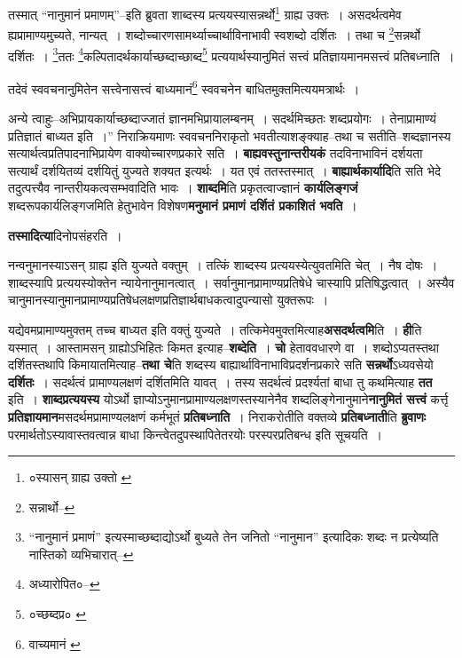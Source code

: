 \documentclass[article,12pt,a4paper]{memoir}
\begin{document}
	तस्मात् “नानुमानं प्रमाणम्”--इति ब्रुवता शाब्दस्य प्रत्ययस्यासन्नर्थो\footnote{०स्यासन् ग्राह्य उक्तो \cite{dp-msA} \cite{dp-edP} \cite{dp-edH} \cite{dp-edN}} ग्राह्य उक्तः । असदर्थत्वमेव ह्यप्रामाण्यमुच्यते, नान्यत् । शब्दोच्चारणसामर्थ्याच्चार्थाविनाभावी स्वशब्दो दर्शितः । तथा च \footnote{सन्नार्थो--\cite{dp-edE}}\-सन्नर्थो दर्शितः । \footnote{“नानुमानं प्रमाणं” इत्यस्माच्छब्दाद्योऽर्थो बुध्यते तेन जनितो “नानुमान” इत्यादिकः शब्दः न प्रत्येष्यति नास्तिको व्यभिचारात्--\cite{dp-msD-n}}\-ततः \footnote{अध्यारोपित०--\cite{dp-msD-n}}\-कल्पितादर्थकार्याच्छब्दाच्छाब्द\footnote{०च्छब्दप्र० \cite{dp-msA}} प्रत्ययार्थस्यानुमितं सत्त्वं प्रतिज्ञायमानमसत्त्वं प्रतिबध्नाति । 
	  
	तदेवं स्ववचनानुमितेन सत्त्वेनासत्त्वं बाध्यमानं\footnote{वाच्यमानं \cite{dp-msA} \cite{dp-msB} \cite{dp-edP} \cite{dp-edH} \cite{dp-edE} \cite{dp-edN}} स्ववचनेन बाधितमुक्तमित्ययमत्रार्थः । 
	  
	अन्ये त्वाहुः--अभिप्रायकार्याच्छब्दाज्जातं ज्ञानमभिप्रायालम्बनम् । सदर्थमिच्छतः शब्दप्रयोगः । तेनाप्रामाण्यं प्रतिज्ञातं बाध्यत इति ।” निराक्रियमाणः स्ववचननिराकृतो भवतीत्याशङ्क्याह--तथा च सतीति--शब्दज्ञानस्य सत्यार्थत्वप्रतिपादनाभिप्रायेण वाक्योच्चारणप्रकारे सति । \textbf{बाह्यवस्तुनान्तरीयकं} तदविनाभाविनं दर्शयता सत्यार्थं दर्शयितव्यं दर्शयितुं युज्यते शक्यत इत्यर्थः । यत एवं ततस्तस्मात् । \textbf{बाह्यार्थकार्यादि}ति सति भेदे तदुत्पत्त्यैव नान्तरीयकत्वसम्भवादिति भावः । \textbf{शाब्दमि}ति प्रकृतत्वाज्ज्ञानं \textbf{कार्यलिङ्गजं} शब्दरूपकार्यलिङ्गजमिति हेतुभावेन विशेषण\textbf{मनुमानं प्रमाणं दर्शितं प्रकाशितं भवति} ।
	\pend
      

	  \pstart \textbf{तस्मादित्या}दिनोपसंहरति ।
	\pend
      

	  \pstart नन्वनुमानस्याऽसन् ग्राह्य इति युज्यते वक्तुम् । तत्किं शाब्दस्य प्रत्ययस्येत्युवतमिति चेत् । नैष दोषः । शाब्दस्यापि प्रत्ययस्योक्तेन न्यायेनानुमानत्वात् । सर्वानुमानप्रामाण्यप्रतिषेधे चास्यापि प्रतिषिद्धत्वात् । अस्यैव चानुमानस्यानुमानप्रामाण्यप्रतिषेधलक्षणप्रतिज्ञार्थबाधकत्वादुपन्यासो युक्तरूपः ।
	\pend
      

	  \pstart यद्येवमप्रामाण्यमुक्तम् तच्च बाध्य\leavevmode{}त इति वक्तुं युज्यते । तत्किमेवमुक्तमित्याह\textbf{असदर्थत्वमि}ति । \textbf{ही}ति यस्मात् । आस्तामसन् ग्राह्योऽभिहितः किमत इत्याह--\textbf{शब्देति} । \textbf{चो} हेताववधारणे वा । शब्दोऽप्यतस्तथा दर्शितस्तथापि किमायातमित्याह--\textbf{तथा चे}ति शब्दस्य बाह्यार्थाविनाभाविप्रदर्शनप्रकारे सति \textbf{सन्नर्थो}ऽध्यवसेयो \textbf{दर्शितः} । सदर्थत्वं प्रामाण्यलक्षणं दर्शितमिति यावत् । तस्य सदर्थत्वं प्रदर्श्यतां बाधा तु कथमित्याह \textbf{तत} इति । \textbf{शाब्दप्रत्ययस्य} योऽर्थो ज्ञाप्योऽनुमानप्रामाण्यलक्षणस्तस्यानेनैव शब्दलिङ्गेनानुमाने\textbf{नानुमितं सत्त्वं} कर्त्तृ \textbf{प्रतिज्ञायमान}मसदर्थमप्रामाण्यलक्षणं कर्मभूतं \textbf{प्रतिबध्नाति} । निराकरोतीति वक्तव्ये \textbf{प्रतिबध्नाती}ति \textbf{ब्रुवाणः} परमार्थतोऽस्यावास्तवत्वान्न बाधा किन्त्वेतदुपस्थापितेतरयोः परस्परप्रतिबन्ध इति सूचयति ।
	\pend
	  \bigskip
	  \begingroup
	
\end{document}
